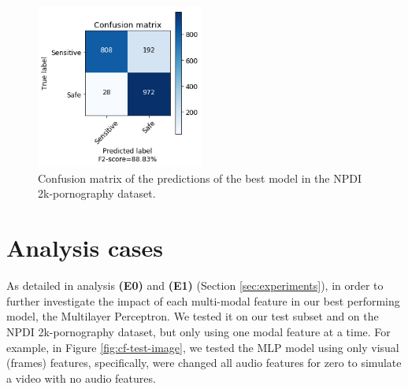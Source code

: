 \begin{figure}[!ht]
    \centering
    \includegraphics[width=0.49\textwidth]{img/results/MLP-2K-TEST.png}
    \caption{Confusion matrix of the predictions of the best model in the NPDI 2k-pornography dataset.}
    \label{fig:cf-test-2k}
\end{figure}

\section{Analysis cases}\label{sec:experiments-discussion}

As detailed in analysis \textbf{(E0)} and \textbf{(E1)} (Section \ref{sec:experiments}), in order to further investigate the impact of each multi-modal feature in our best performing model, the Multilayer Perceptron. We tested it on our test subset and on the NPDI 2k-pornography dataset, but only using one modal feature at a time. For example, in Figure \ref{fig:cf-test-image}, we tested the MLP model using only visual (frames) features, specifically, were changed all audio features for zero to simulate a video with no audio features.

